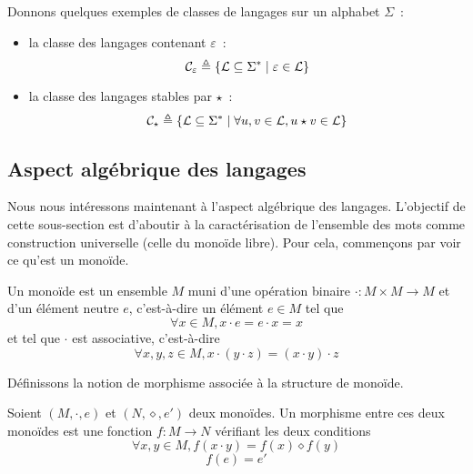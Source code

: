 \begin{example}
  Donnons quelques exemples de classes de langages sur un alphabet $\Sigma$~:
  \begin{itemize}
  \item la classe des langages contenant $\varepsilon$~:
    \[\mathcal C_\varepsilon \triangleq \{\mathcal L \subseteq \Sigma^*\mid
    \varepsilon \in \mathcal L\}\]
  \item la classe des langages stables par $\star$~:
    \[\mathcal C_\star \triangleq \{\mathcal L \subseteq \Sigma^*\mid
    \forall u,v\in\mathcal L, u\star v \in \mathcal L\}\]
  \end{itemize}
\end{example}

\subsection{Aspect algébrique des langages}

Nous nous intéressons maintenant à l'aspect algébrique des langages. L'objectif
de cette sous-section est d'aboutir à la caractérisation de l'ensemble des mots
comme construction universelle (celle du monoïde libre). Pour cela, commençons
par voir ce qu'est un monoïde.

\begin{definition}[Monoïde]
  Un monoïde est un ensemble $M$ muni d'une opération binaire
  $\cdot : M \times M \to M$ et d'un élément neutre $e$,
  c'est-à-dire un élément $e\in M$ tel que
  \[\forall x\in M, x\cdot e = e \cdot x = x\]
  et tel que $\cdot$ est associative, c'est-à-dire
  \[\forall x,y,z\in M, x\cdot (y\cdot z) = (x\cdot y) \cdot z\]
\end{definition}

Définissons la notion de morphisme associée à la structure de monoïde.

\begin{definition}
  Soient $(M,\cdot,e)$ et $(N,\diamond,e')$ deux monoïdes. Un morphisme entre
  ces deux monoïdes est une fonction $f : M \to N$ vérifiant les deux conditions
  \begin{equation}
    \forall x,y\in M, f(x\cdot y) = f(x)\diamond f(y)
  \end{equation}
  \begin{equation}
    f(e) = e'
  \end{equation}
\end{definition}

